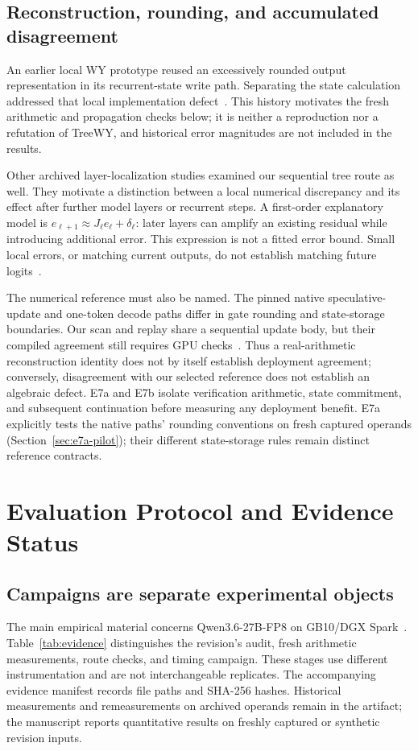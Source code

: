 \documentclass[conference]{IEEEtran}
\begin{document}
\subsection{Reconstruction, rounding, and accumulated disagreement}
\label{sec:reconstruction-numerics}
An earlier local WY prototype reused an excessively rounded output representation in its recurrent-state write path. Separating the state calculation addressed that local implementation defect~\cite{lumo2026archive}. This history motivates the fresh arithmetic and propagation checks below; it is neither a reproduction nor a refutation of TreeWY, and historical error magnitudes are not included in the results.

Other archived layer-localization studies examined our sequential tree route as well. They motivate a distinction between a local numerical discrepancy and its effect after further model layers or recurrent steps. A first-order explanatory model is $e_{\ell+1}\approx J_\ell e_\ell+\delta_\ell$: later layers can amplify an existing residual while introducing additional error. This expression is not a fitted error bound. Small local errors, or matching current outputs, do not establish matching future logits~\cite{lumo2026archive}.

The numerical reference must also be named. The pinned native speculative-update and one-token decode paths differ in gate rounding and state-storage boundaries. Our scan and replay share a sequential update body, but their compiled agreement still requires GPU checks~\cite{lumo2026archive}. Thus a real-arithmetic reconstruction identity does not by itself establish deployment agreement; conversely, disagreement with our selected reference does not establish an algebraic defect. E7a and E7b isolate verification arithmetic, state commitment, and subsequent continuation before measuring any deployment benefit. E7a explicitly tests the native paths' rounding conventions on fresh captured operands (Section~\ref{sec:e7a-pilot}); their different state-storage rules remain distinct reference contracts.

\section{Evaluation Protocol and Evidence Status}
\label{sec:protocol}
\subsection{Campaigns are separate experimental objects}
The main empirical material concerns Qwen3.6-27B-FP8 on GB10/DGX Spark~\cite{qwen2026qwen36fp8,lumo2026archive}. Table~\ref{tab:evidence} distinguishes the revision's audit, fresh arithmetic measurements, route checks, and timing campaign. These stages use different instrumentation and are not interchangeable replicates. The accompanying evidence manifest records file paths and SHA-256 hashes. Historical measurements and remeasurements on archived operands remain in the artifact; the manuscript reports quantitative results on freshly captured or synthetic revision inputs.
\end{document}
